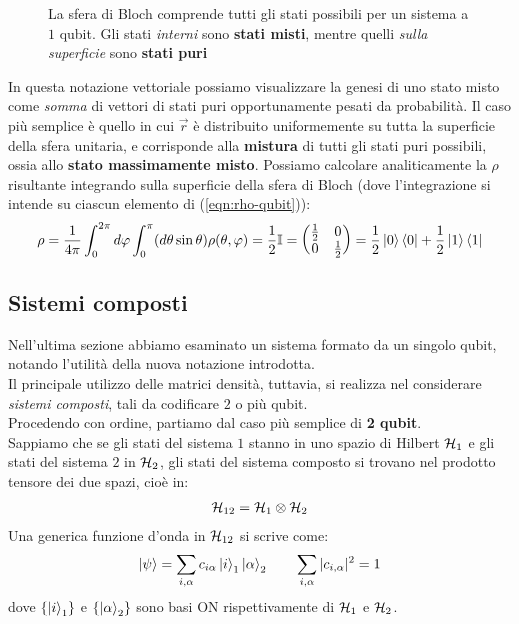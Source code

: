\documentclass[../../InformazioneQuantistica.tex]{subfiles}
\begin{document}
\begin{figure}
    \centering
    
    \caption{La sfera di Bloch comprende tutti gli stati possibili per un sistema a $1$ qubit. Gli stati \textit{interni} sono \textbf{stati misti}, mentre quelli \textit{sulla superficie} sono \textbf{stati puri}}
    \label{fig:sfera-bloch-stati}
\end{figure}

In questa notazione vettoriale possiamo visualizzare la genesi di uno stato misto come \textit{somma} di vettori di stati puri opportunamente pesati da probabilità. Il caso più semplice è quello in cui $\vec{r}$ è distribuito uniformemente su tutta la superficie della sfera unitaria, e corrisponde alla \textbf{mistura} di tutti gli stati puri possibili, ossia allo \textbf{stato massimamente misto}. Possiamo calcolare analiticamente la $\rho$ risultante integrando sulla superficie della sfera di Bloch (dove l'integrazione si intende su ciascun elemento di (\ref{eqn:rho-qubit})):
\begin{align*}
\rho = \frac{1}{4\pi}\int_0^{2\pi} d\varphi \int_0^\pi (d\theta \sin\theta) \rho(\theta,\varphi) = \frac{1}{2}\mathbb{I} = \begin{pmatrix}
\frac{1}{2} & 0 \\ 0 & \frac{1}{2}\end{pmatrix} = \frac{1}{2}\Ket{0}\Bra{0} + \frac{1}{2}\Ket{1}\Bra{1}
\end{align*}

\subsection{Sistemi composti}
Nell'ultima sezione abbiamo esaminato un sistema formato da un singolo qubit, notando l'utilità della nuova notazione introdotta.\\
Il principale utilizzo delle matrici densità, tuttavia, si realizza nel considerare \textit{sistemi composti}, tali da codificare $2$ o più qubit.\\
Procedendo con ordine, partiamo dal caso più semplice di \textbf{2 qubit}.\\
Sappiamo che se gli stati del sistema $1$ stanno in uno spazio di Hilbert $\mathcal{H}_1$ e gli stati del sistema $2$ in $\mathcal{H}_2$, gli stati del sistema composto si trovano nel prodotto tensore dei due spazi, cioè in:
\begin{align*}
\mathcal{H}_{12} = \mathcal{H}_1 \otimes \mathcal{H}_2
\end{align*}
Una generica funzione d'onda in $\mathcal{H}_{12}$ si scrive come:
\begin{align*}
\Ket{\psi} = \sum_{i,\alpha} c_{i\alpha} \Ket{i}_1\Ket{\alpha}_2 \qquad \sum_{i,\alpha} |c_{i,\alpha}|^2 = 1
\end{align*}
dove $\{\Ket{i}_1\}$ e $\{\Ket{\alpha}_2\}$ sono basi ON rispettivamente di $\mathcal{H}_1$ e $\mathcal{H}_2$.\\
\end{document}
